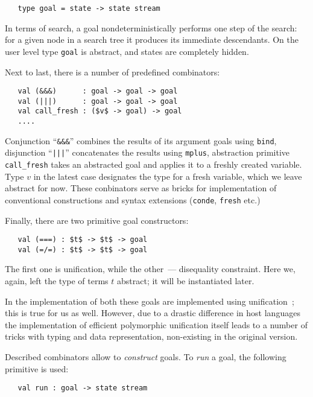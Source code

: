 \begin{lstlisting}
   type goal = state -> state stream
\end{lstlisting}

In terms of search, a goal nondeterministically performs one step of the search: for a given
node in a search tree it produces its immediate descendants. On the user level type \lstinline{goal}
is abstract, and states are completely hidden.

Next to last, there is a number of predefined combinators:

\begin{lstlisting}
   val (&&&)      : goal -> goal -> goal
   val (|||)      : goal -> goal -> goal
   val call_fresh : ($v$ -> goal) -> goal
   ....
\end{lstlisting}

Conjunction ``\lstinline{&&&}'' combines the results of its argument goals using \lstinline{bind}, 
disjunction ``\lstinline{|||}'' concatenates the results using \lstinline{mplus}, abstraction
primitive \lstinline{call_fresh} takes an abstracted goal and applies it to a freshly created
variable. Type $v$ in the latest case designates the type for a fresh variable, which we leave
abstract for now. These conbinators serve as bricks for implementation of conventional 
\miniKanren constructions and syntax extensions (\lstinline{conde}, \lstinline{fresh} etc.)

Finally, there are two primitive goal constructors:

\begin{lstlisting}
   val (===) : $t$ -> $t$ -> goal
   val (=/=) : $t$ -> $t$ -> goal
\end{lstlisting}

The first one is unification, while the other~--- disequality constraint. Here we, again, left 
the type of terms $t$ abstract; it will be instantiated later.

In the implementation of \miniKanren both these goals are implemented using unification~\cite{CKanren}; this
is true for us as well. However, due to a drastic difference in host languages the implementation of
efficient polymorphic unification itself leads to a number of tricks with typing and data representation,
non-existing in the original version.

Described combinators allow to \emph{construct} goals. To \emph{run} a goal, the following
primitive is used:

\begin{lstlisting}
   val run : goal -> state stream
\end{lstlisting}


